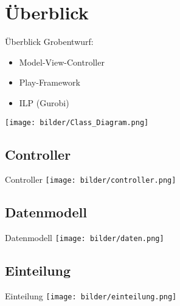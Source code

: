 \documentclass[18pt]{beamer}
\begin{document}
\section{Überblick}
\begin{frame}{Überblick}
Grobentwurf:
\begin{itemize}
  \item Model-View-Controller
  \item Play-Framework
  \item ILP (Gurobi) %
\end{itemize}
\end{frame}

\begin{frame}
\texttt{[image: bilder/Class\_Diagram.png]}
\end{frame}

\subsection{Controller}
\begin{frame}{Controller}
\texttt{[image: bilder/controller.png]}
\end{frame}

\subsection{Datenmodell}
\begin{frame}{Datenmodell}
\texttt{[image: bilder/daten.png]}
\end{frame}

\subsection{Einteilung}
\begin{frame}{Einteilung}
\texttt{[image: bilder/einteilung.png]}
\end{frame}
\end{document}
